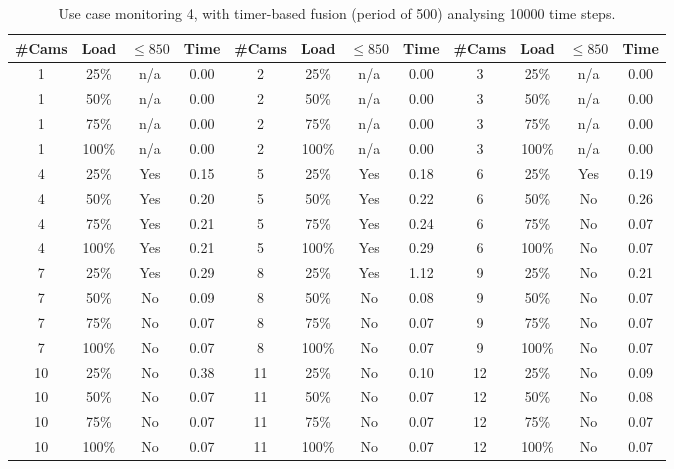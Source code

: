 \documentclass{article}
\begin{document}
\begin{table}
\centering
\begin{tabular}{|c|c|c|c|c|c|c|c|c|c|c|c|}
\hline
\#Cams & Load & $\leq 850$ & Time & \#Cams & Load & $\leq 850$ & Time & \#Cams & Load & $\leq 850$ & Time\\
\hline
1 & 25\% & n/a & 0.00 & 2 & 25\% & n/a & 0.00 & 3 & 25\% & n/a & 0.00\\
1 & 50\% & n/a & 0.00 & 2 & 50\% & n/a & 0.00 & 3 & 50\% & n/a & 0.00\\
1 & 75\% & n/a & 0.00 & 2 & 75\% & n/a & 0.00 & 3 & 75\% & n/a & 0.00\\
1 & 100\% & n/a & 0.00 & 2 & 100\% & n/a & 0.00 & 3 & 100\% & n/a & 0.00\\
\hline
4 & 25\% & Yes & 0.15 & 5 & 25\% & Yes & 0.18 & 6 & 25\% & Yes & 0.19\\
4 & 50\% & Yes & 0.20 & 5 & 50\% & Yes & 0.22 & 6 & 50\% & No & 0.26\\
4 & 75\% & Yes & 0.21 & 5 & 75\% & Yes & 0.24 & 6 & 75\% & No & 0.07\\
4 & 100\% & Yes & 0.21 & 5 & 100\% & Yes & 0.29 & 6 & 100\% & No & 0.07\\
\hline
7 & 25\% & Yes & 0.29 & 8 & 25\% & Yes & 1.12 & 9 & 25\% & No & 0.21\\
7 & 50\% & No & 0.09 & 8 & 50\% & No & 0.08 & 9 & 50\% & No & 0.07\\
7 & 75\% & No & 0.07 & 8 & 75\% & No & 0.07 & 9 & 75\% & No & 0.07\\
7 & 100\% & No & 0.07 & 8 & 100\% & No & 0.07 & 9 & 100\% & No & 0.07\\
\hline
10 & 25\% & No & 0.38 & 11 & 25\% & No & 0.10 & 12 & 25\% & No & 0.09\\
10 & 50\% & No & 0.07 & 11 & 50\% & No & 0.07 & 12 & 50\% & No & 0.08\\
10 & 75\% & No & 0.07 & 11 & 75\% & No & 0.07 & 12 & 75\% & No & 0.07\\
10 & 100\% & No & 0.07 & 11 & 100\% & No & 0.07 & 12 & 100\% & No & 0.07\\
\hline
\end{tabular}
\caption{Use case monitoring 4, with timer-based fusion (period of 500) analysing 10000 time steps.}
\end{table}
\end{document}
